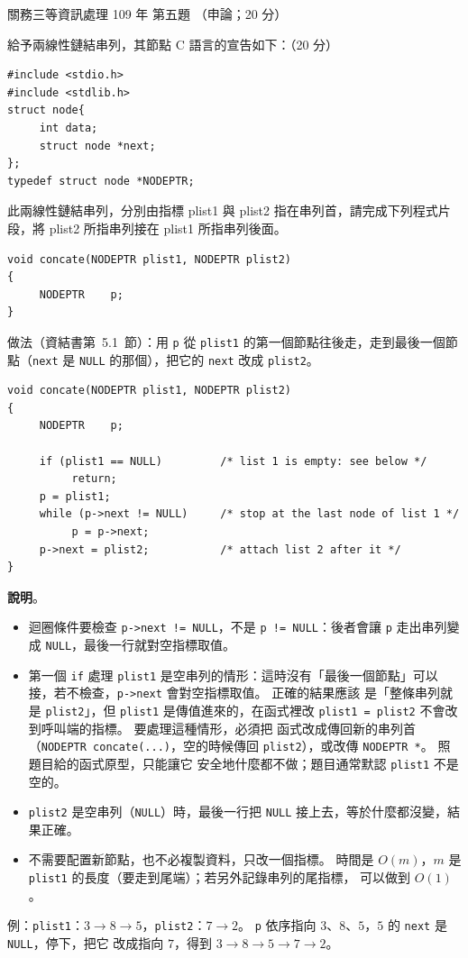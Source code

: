 \begin{pastexam}[label={px:gw3-109-ds-05}]{關務三等資訊處理 109 年 第五題}
（申論；20 分）

給予兩線性鏈結串列，其節點 C 語言的宣告如下：（20 分）
\begin{verbatim}
#include <stdio.h>
#include <stdlib.h>
struct node{
     int data;
     struct node *next;
};
typedef struct node *NODEPTR;
\end{verbatim}
此兩線性鏈結串列，分別由指標 plist1 與 plist2 指在串列首，請完成下列程式片段，將 plist2 所指串列接在 plist1 所指串列後面。
\begin{verbatim}
void concate(NODEPTR plist1, NODEPTR plist2)
{
     NODEPTR    p;
}
\end{verbatim}
\end{pastexam}

\begin{pastsoln}
做法（資結書第~5.1~節）：用 \texttt{p} 從 \texttt{plist1} 的第一個節點往後走，走到最後一個節點（\texttt{next} 是 \texttt{NULL} 的那個），把它的
\texttt{next} 改成 \texttt{plist2}。
\begin{verbatim}
void concate(NODEPTR plist1, NODEPTR plist2)
{
     NODEPTR    p;

     if (plist1 == NULL)         /* list 1 is empty: see below */
          return;
     p = plist1;
     while (p->next != NULL)     /* stop at the last node of list 1 */
          p = p->next;
     p->next = plist2;           /* attach list 2 after it */
}
\end{verbatim}

\textbf{說明}。
\begin{itemize}
\item 迴圈條件要檢查 \texttt{p->next != NULL}，不是 \texttt{p != NULL}：後者會讓 \texttt{p} 走出串列變成 \texttt{NULL}，最後一行就對空指標取值。
\item 第一個 \texttt{if} 處理 \texttt{plist1} 是空串列的情形：這時沒有「最後一個節點」可以接，若不檢查，\texttt{p->next} 會對空指標取值。 正確的結果應該
是「整條串列就是 \texttt{plist2}」，但 \texttt{plist1} 是傳值進來的，在函式裡改 \texttt{plist1 = plist2} 不會改到呼叫端的指標。 要處理這種情形，必須把
函式改成傳回新的串列首（\texttt{NODEPTR concate(...)}，空的時候傳回 \texttt{plist2}），或改傳 \texttt{NODEPTR *}。 照題目給的函式原型，只能讓它
安全地什麼都不做；題目通常默認 \texttt{plist1} 不是空的。
\item \texttt{plist2} 是空串列（\texttt{NULL}）時，最後一行把 \texttt{NULL} 接上去，等於什麼都沒變，結果正確。
\item 不需要配置新節點，也不必複製資料，只改一個指標。 時間是 $O(m)$，$m$ 是 \texttt{plist1} 的長度（要走到尾端）；若另外記錄串列的尾指標，
可以做到 $O(1)$。
\end{itemize}

例：\texttt{plist1}：$3 \to 8 \to 5$，\texttt{plist2}：$7 \to 2$。 \texttt{p} 依序指向 $3$、$8$、$5$，$5$ 的 \texttt{next} 是 \texttt{NULL}，停下，把它
改成指向 $7$，得到 $3 \to 8 \to 5 \to 7 \to 2$。
\end{pastsoln}
